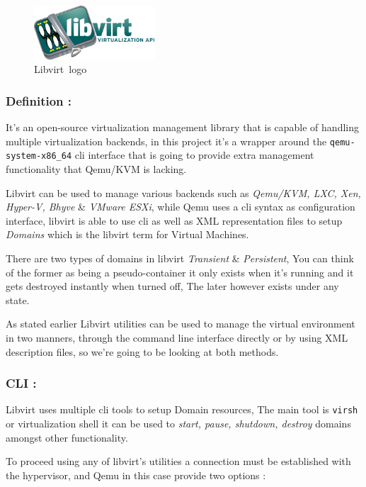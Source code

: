 \documentclass[
  14pt,
  english,
  a4paper,
]{scrreprt}
\begin{document}
\begin{figure}
\centering
\includegraphics[width=0.4\textwidth,height=\textheight]{figures/Libvirt-text-logo.png}
\caption{Libvirt~logo}
\end{figure}

\hypertarget{definition-7}{%
\subsubsection{Definition :}\label{definition-7}}

It's an open-source virtualization management library that is capable of
handling multiple virtualization backends, in this project it's a
wrapper around the \texttt{qemu-system-x86\_64} cli interface that is
going to provide extra management functionality that Qemu/KVM is
lacking.

Libvirt can be used to manage various backends such as \emph{Qemu/KVM,
LXC, Xen, Hyper-V, Bhyve} \& \emph{VMware ESXi}, while Qemu uses a cli
syntax as configuration interface, libvirt is able to use cli as well as
XML representation files to setup \emph{Domains} which is the libvirt
term for Virtual Machines.

There are two types of domains in libvirt \emph{Transient} \&
\emph{Persistent}, You can think of the former as being a
pseudo-container it only exists when it's running and it gets destroyed
instantly when turned off, The later however exists under any state.

As stated earlier Libvirt utilities can be used to manage the virtual
environment in two manners, through the command line interface directly
or by using XML description files, so we're going to be looking at both
methods.

\hypertarget{cli-2}{%
\subsubsection{CLI :}\label{cli-2}}

Libvirt uses multiple cli tools to setup Domain resources, The main tool
is \texttt{virsh} or virtualization shell it can be used to \emph{start,
pause, shutdown, destroy} domains amongst other functionality.

To proceed using any of libvirt's utilities a connection must be
established with the hypervisor, and Qemu in this case provide two
options :
\end{document}
